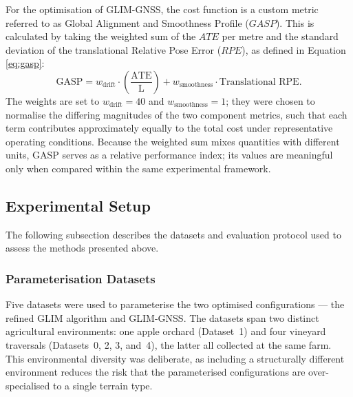 For the optimisation of GLIM-GNSS, the cost function is a custom metric referred to as Global Alignment and Smoothness Profile ($GASP$). This is calculated by taking the weighted sum of the $ATE$ per metre and the standard deviation of the translational Relative Pose Error ($RPE$), as defined in Equation \eqref{eq:gasp}:
\begin{equation}
\label{eq:gasp}
\text{GASP} = w_{\text{drift}} \cdot \left( \frac{\mathrm{ATE}}{\mathrm{L}} \right) + w_{\text{smoothness}} \cdot \text{Translational RPE}.
\end{equation}
The weights are set to $w_{\text{drift}} = 40$ and $w_{\text{smoothness}} = 1$; they were chosen to normalise the differing magnitudes of the two component metrics, such that each term contributes approximately equally to the total cost under representative operating conditions. Because the weighted sum mixes quantities with different units, GASP serves as a relative performance index; its values are meaningful only when compared within the same experimental framework.

\subsection{Experimental Setup}
\label{subsec:slam-experimental-setup}

The following subsection describes the datasets and evaluation protocol used to assess the methods presented above.

\subsubsection{Parameterisation Datasets}

Five datasets were used to parameterise the two optimised configurations — the refined GLIM algorithm and GLIM-GNSS. The datasets span two distinct agricultural environments: one apple orchard (Dataset~1) and four vineyard traversals (Datasets~0, 2, 3, and~4), the latter all collected at the same farm. This environmental diversity was deliberate, as including a structurally different environment reduces the risk that the parameterised configurations are over-specialised to a single terrain type.


